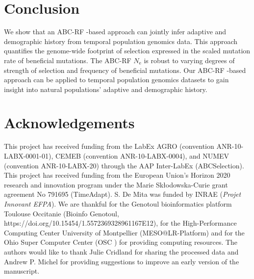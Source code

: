 \documentclass[a4paper, 12pt]{article}
\begin{document}
\section*{Conclusion}

We show that an ABC-RF -based approach can jointly infer adaptive and demographic history from temporal population genomics data. This approach quantifies the genome-wide footprint of selection expressed in the scaled mutation rate of beneficial mutations. The ABC-RF $N_{\mathrm{e}}$ is robust to varying degrees of strength of selection and frequency of beneficial mutations. Our ABC-RF -based approach can be applied to temporal population genomics datasets to gain insight into natural populations' adaptive and demographic history.
\section*{Acknowledgements}

This project has received funding from the LabEx AGRO (convention ANR-10-LABX-0001-01), CEMEB (convention ANR-10-LABX-0004), and NUMEV (convention ANR-10-LABX-20) through the AAP Inter-LabEx (ABCSelection). This project has received funding from the European Union's Horizon 2020 research and innovation program under the Marie Skłodowska-Curie grant agreement No 791695 (TimeAdapt). S. De Mita was funded by INRAE (\textit{Projet Innovant EFPA}). We are thankful for the Genotoul bioinformatics platform Toulouse Occitanie (Bioinfo Genotoul, https://doi.org/10.15454/1.5572369328961167E12), for the High-Performance Computing Center University of Montpellier (MESO@LR-Platform) and for the Ohio Super Computer Center (OSC \citet{OhioSupercomputerCenter1987}) for providing computing resources. The authors would like to thank Julie Cridland for sharing the processed data and Andrew P. Michel for providing suggestions to improve an early version of the manuscript. 



\end{document}
